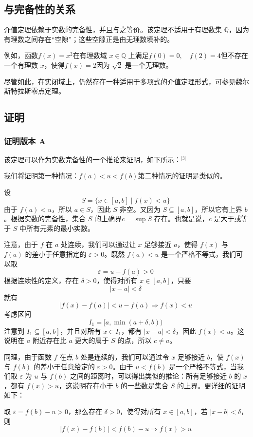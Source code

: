 \subsection{与完备性的关系}
介值定理依赖于实数的完备性，并且与之等价。该定理不适用于有理数集 $\mathbb{Q}$，因为有理数之间存在“空隙”；这些空隙正是由无理数填补的。

例如，函数$f(x) = x^2$在有理数域 $x \in \mathbb{Q}$ 上满足$f(0) = 0, \quad f(2) = 4$但不存在一个有理数 $x$，使得$f(x) = 2$因为 $\sqrt{2}$ 是一个无理数。

尽管如此，在实闭域上，仍然存在一种适用于多项式的介值定理形式，可参见魏尔斯特拉斯零点定理。
\subsection{证明}
\subsubsection{证明版本 A}
该定理可以作为实数完备性的一个推论来证明，如下所示：\(^\text{[3]}\)

我们将证明第一种情况：$f(a) < u < f(b)$第二种情况的证明是类似的。

设
$$
S = \{x \in [a, b] \mid f(x) < u\}~
$$
由于 $f(a) < u$，所以 $a \in S$，因此 $S$ 非空。又因为 $S \subseteq [a, b]$，所以它有上界 $b$。根据实数的完备性，集合 $S$ 的上确界$c = \sup S$
存在。也就是说，$c$ 是大于或等于 $S$ 中所有元素的最小实数。

注意，由于 $f$ 在 $a$ 处连续，我们可以通过让 $x$ 足够接近 $a$，使得 $f(x)$ 与 $f(a)$ 的差小于任意指定的 $\varepsilon > 0$。既然 $f(a) < u$ 是一个严格不等式，我们可以取
$$
\varepsilon = u - f(a) > 0~
$$
根据连续性的定义，存在 $\delta > 0$，使得对所有 $x \in [a, b]$，只要
$$
|x - a| < \delta~
$$
就有
$$
|f(x) - f(a)| < u - f(a) \Rightarrow f(x) < u~
$$
考虑区间
$$
I_1 = [a, \min(a + \delta, b))~
$$
注意到 $I_1 \subseteq [a, b]$，并且对所有 $x \in I_1$，都有 $|x - a| < \delta$，因此 $f(x) < u$。这说明在 $a$ 附近存在比 $a$ 更大的属于 $S$ 的点，所以 $c \ne a$。

同理，由于函数 $f$ 在点 $b$ 处是连续的，我们可以通过令 $x$ 足够接近 $b$，使 $f(x)$ 与 $f(b)$ 的差小于任意给定的 $\varepsilon > 0$。由于 $u < f(b)$ 是一个严格不等式，当我们取 $\varepsilon$ 为 $u$ 与 $f(b)$ 之间的距离时，可以得出类似的推论：所有足够接近 $b$ 的 $x$，都有 $f(x) > u$，这说明存在小于 $b$ 的一些数是集合 $S$ 的上界。更详细的证明如下：

取 $\varepsilon = f(b) - u > 0$，那么存在 $\delta > 0$，使得对所有 $x \in [a, b]$，若 $|x - b| < \delta$，则
$$
|f(x) - f(b)| < f(b) - u \Rightarrow f(x) > u~
$$

